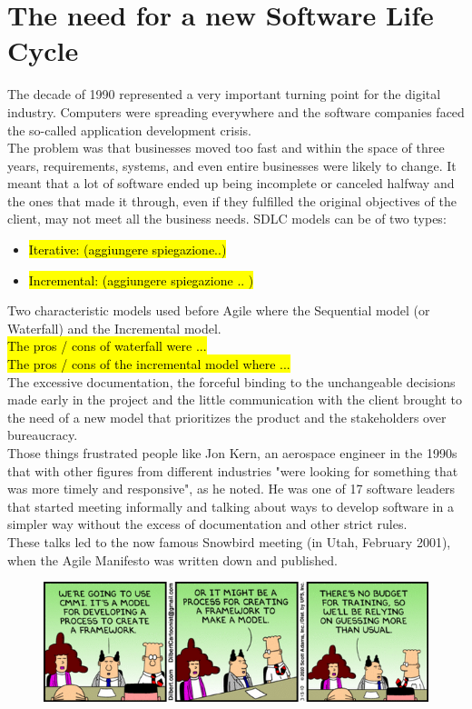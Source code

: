 \section{The need for a new Software Life Cycle}
	The decade of 1990 represented a very important turning point for the digital industry.
	Computers were spreading everywhere and the software companies faced the so-called application development crisis.\\
	The problem was that businesses moved too fast and within the space of three years, requirements, systems, and even entire businesses were likely to change. 
	It meant that a lot of software ended up being incomplete or canceled halfway and the ones that made it through, even if they fulfilled the original objectives of the client, may not meet all the business needs.
	SDLC models can be of two types:
	\begin{itemize}
		\item \hl{Iterative: (aggiungere spiegazione..)}
		\item \hl{Incremental: (aggiungere spiegazione .. )}
	\end{itemize}
	Two characteristic models used before Agile where the Sequential model (or Waterfall) and the Incremental model.\\
	\hl{The pros / cons of waterfall were ... \\
	The pros / cons of the incremental model where ...}\\
	The excessive documentation, the forceful binding to the unchangeable decisions made early in the project and the little communication with the client brought to the need of a new model that prioritizes the product and the stakeholders over bureaucracy.\\
	Those things frustrated people like Jon Kern, an aerospace engineer in the 1990s that with other figures from different industries "were looking for something that was more timely and responsive", as he noted.
	He was one of 17 software leaders that started meeting informally and talking about ways to develop software in a simpler way without the excess of documentation and other strict rules.\\
	These talks led to the now famous Snowbird meeting (in Utah, February 2001), when the Agile Manifesto was written down and published.
	\begin{figure}[H]
		\centering
		\includegraphics[width=\textwidth]{resources/BffFTn_CAAAEvGn}\\
	\end{figure}

